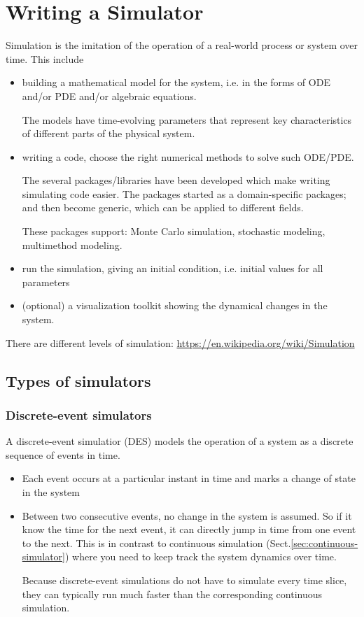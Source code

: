 \chapter{Writing a Simulator}


Simulation is the imitation of the operation of a real-world process or system
over time. This include
\begin{itemize}
  \item building a mathematical model for the system, i.e. in the forms of ODE
  and/or PDE and/or algebraic equations.
  
  The models have time-evolving parameters
  that represent key characteristics of different parts of the physical system.
   
  \item writing a code, choose the right numerical methods to solve such
  ODE/PDE.
  
  The several packages/libraries have been developed which make writing
  simulating code easier. The packages started as a domain-specific packages;
  and then become generic, which can be applied to different fields.
  
  These packages support: Monte Carlo simulation, stochastic modeling,
  multimethod modeling.
  
  \item run the simulation, giving an initial condition, i.e. initial values for
  all parameters
   
   \item (optional) a visualization toolkit showing the dynamical changes in the
   system.
\end{itemize}

There are different levels of simulation:
\url{https://en.wikipedia.org/wiki/Simulation}


\section{Types of simulators}

\subsection{Discrete-event simulators}
\label{sec:discrete-event-simulator}

A discrete-event simulatior (DES) models the operation of a system as a
discrete sequence of events in time.
\begin{itemize}
  \item  Each event occurs at a particular instant in time and marks a change of
  state in the system
  
  \item Between two consecutive events, no change in the system is assumed. So
  if it know the time for the next event, it can directly jump in time from one
  event to the next. This is in contrast to continuous simulation
  (Sect.\ref{sec:continuous-simulator}) where you need to keep track the
  system dynamics over time.
  
  Because discrete-event simulations do not have to simulate every time slice,
  they can typically run much faster than the corresponding continuous simulation.
\end{itemize}

